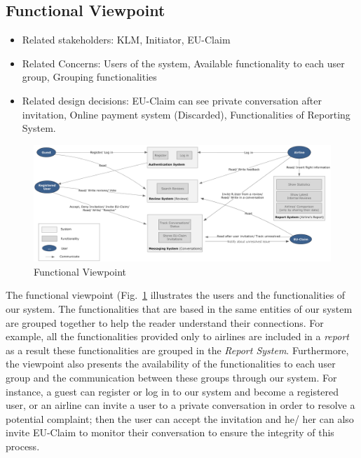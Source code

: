 % 

\subsection{Functional Viewpoint}

\begin{itemize}
\item Related stakeholders: KLM, Initiator, EU-Claim
\item Related Concerns: Users of the system, Available functionality to each user group, Grouping functionalities
\item Related design decisions: EU-Claim can see private conversation after invitation, Online payment system (Discarded), Functionalities of Reporting System.
\end{itemize}

\newpage
\begin{landscape}
\begin{figure}
\includegraphics[width=600px]{Functional_Viewpoint.jpg}
\caption{Functional Viewpoint}
\label{fig:functional}
\end{figure}
\end{landscape}

The functional viewpoint (Fig.~\ref{fig:functional} illustrates the users and the functionalities of our system. The functionalities
 that are based in the same entities of our system are grouped together to help the reader understand their connections.  For example, all the functionalities 
 provided only to airlines are included in a {\em report} as a result these functionalities are grouped in the {\em Report System}. Furthermore, the viewpoint also presents the 
 availability of the functionalities to each user group and the communication between these groups through our system. For instance, a guest can register or log in to our system and
 become a registered user, or an airline can invite a user to a private conversation in order to resolve a potential complaint; then the user can accept the invitation and he/ her can 
 also invite EU-Claim to monitor their conversation to ensure the integrity of this process.